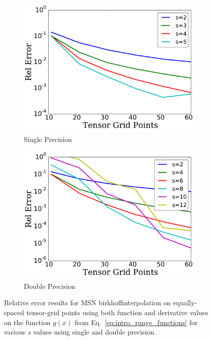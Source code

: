 \begin{figure}
\centering
    \begin{subfigure}{0.45\textwidth}
    \includegraphics[width=\textwidth]{plots/msn_birkhoff_2d_single.pdf}
    \caption{Single Precision}
    \end{subfigure}
    \begin{subfigure}{0.45\textwidth}
    \includegraphics[width=\textwidth]{plots/msn_birkhoff_2d_double.pdf}
    \caption{Double Precision}
    \end{subfigure}
\caption[MSN 2D Birkhoff Interpolation Relative Error]{
Relative error results for MSN birkhoffinterpolation on equally-spaced
tensor-grid points using both function and derivative values
on the function $g(x)$ from Eq.~\eqref{eq:intro_runge_functions}
for various $s$ values using single and double precision.}
\label{fig:intro_msn_birkhoff_2d}
\end{figure}



